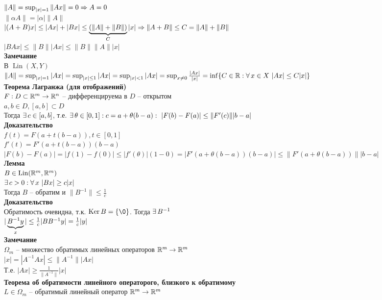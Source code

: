 \documentclass[12pt]{article}
\DeclareMathOperator{\Lin}{Lin}
\begin{document}
$\|A\|=\sup_{|x|=1} \|Ax\| = 0 \Rto A = 0$\\
$\|\alpha A\| = |\alpha| \|A\|$\\
$|(A+B)x| \leq |Ax| + |Bx| \leq \ub{C}{(\|A\|+\|B\|)}|x| \Rto \|A+B\| \leq C = \|A\|+\|B\|$\\
$|BAx|\leq \|B\||Ax| \leq \|B\|\|A\||x|$\\
\textbf{Замечание}\\
В $\Lin(X, Y)$\\
$\|A\|=\sup_{|x|=1} |Ax| = \sup_{|x|\leq 1} |Ax| = \sup_{|x|<1}|Ax| = \sup_{x\neq 0} \frac{|Ax|}{|x|} = \inf\{C\in \Rset: \fall x \in X\ |Ax| \leq C|x|\}$\\
\textbf{Теорема Лагранжа (для отображений)}\\
$F: D \subset \Rset^m \rto \Rset^n$ -- дифференцируема в $D$ -- открытом\\
$a, b \in D, [a,b] \subset D$\\
Тогда $\ex c \in [a,b]$, т.е. $\ex \theta \in [0,1]: c = a+\theta(b-a):\ |F(b)-F(a)| \leq \|F'(c)\||b-a|$\\
\textbf{Доказательство}\\
$f(t) = F(a+t(b-a)), t \in [0,1]$\\
$f'(t) = F'(a+t(b-a))(b-a)$\\
$|F(b)-F(a)|=|f(1)-f(0)| \leq |f'(\theta)|(1-0) = |F'(a+\theta(b-a))(b-a)| \leq \|F'(a+\theta(b-a))\||b-a|$\\
\textbf{Лемма}\\
$B\in \Lin(\Rset^m, \Rset^m)$\\
$\ex c > 0: \fall x\ |Bx| \geq c|x|$\\
Тогда $B$ -- обратим и $\|B^{-1}\| \leq \frac1c$\\
\textbf{Доказательство}\\
Обратимость очевидна, т.к. $\ker B = \{\0\}$. Тогда $\ex B^{-1}$\\
$|\ub{x}{B^{-1}y}| \leq \frac1c |BB^{-1}y| = \frac1c|y|$\\
\textbf{Замечание}\\
$\Omega_m$ -- множество обратимых линейных операторов $\Rset^m \rto\Rset^m$\\
$|x| = |A^{-1}Ax| \leq \|A^{-1}\||Ax|$\\
Т.е. $|Ax| \geq \frac1{\|A^{-1}\|}|x|$\\
\textbf{Теорема об обратимости линейного операторого, близкого к обратимому}\\
$L \in \Omega_m$ -- обратимый линейный оператор $\Rset^m \rto \Rset^m$\\
\end{document}
